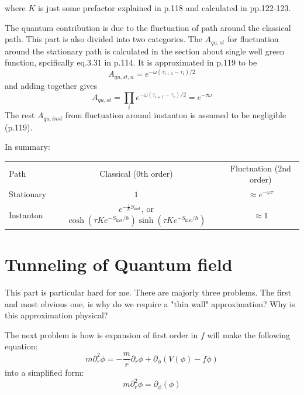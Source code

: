\documentclass{article}
\begin{document}
where $K$ is just some prefactor explained in p.118 and calculated in
pp.122-123.

The quantum contribution is due to the fluctuation of path around the classical
path. This part is also divided into two categories. The $A_{qu,st}$ for
fluctuation around the stationary path is calculated in the section about single
well green function, spcifically eq.3.31 in p.114. It is approximated in p.119
to be
\begin{equation}
    A_{qu,st,n} = e^{-\omega(\tau_{i+1}-\tau_i)/2}
\end{equation}
and adding together gives
\begin{equation}
    A_{qu,st}= \prod_i e^{-\omega(\tau_{i+1}-\tau_i)/2} = e^{-\tau\omega}
\end{equation}
The rest $A_{qu,inst}$ from fluctuation around instanton is assumed to be
negligible (p.119).

In summary:
\begin{table}[H]
    \centering
    \begin{tabular}{l c c}
        Path       & Classical ($0$th order) & Fluctuation ($2$nd order) \\
        Stationary & $1$                     & $\approx e^{-\omega\tau}$  \\
        Instanton  & $e^{-\frac{1}{\hbar}S_{\text{inst}}}$, or $\cosh(\tau Ke^{-S_{\text{inst}}/\hbar}) \sinh(\tau Ke^{-S_{\text{inst}}/\hbar})$ & $\approx 1$\\
    \end{tabular}
\end{table}

\section{Tunneling of Quantum field}

This part is particular hard for me. There are majorly three problems. The first
and most obvious one, is why do we require a "thin wall" approximation? Why is
this approximation physical?

The next problem is how is expansion of first order in $f$ will make the
following equation:
\begin{equation}
    m\partial^2_r \phi = -\frac{m}{r}\partial_r \phi +
    \partial_\phi\left(V(\phi)-f\phi\right)
\end{equation}
into a simplified form:
\begin{equation}
    m\partial^2_r \phi = \partial_\phi(\phi)
\end{equation}
\end{document}
